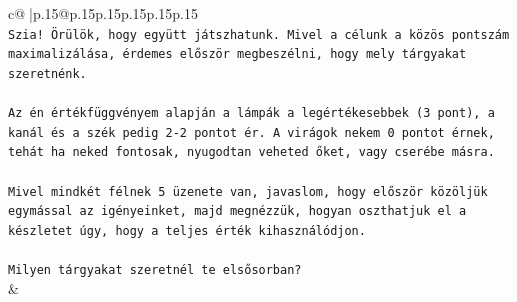 \documentclass{article}
\begin{document}
{\begin{supertabular}{c@{$\;$}|p{.15\linewidth}@{}p{.15\linewidth}p{.15\linewidth}p{.15\linewidth}p{.15\linewidth}p{.15\linewidth}}
{{{\\ 
\texttt{Szia! Örülök, hogy együtt játszhatunk. Mivel a célunk a közös pontszám maximalizálása, érdemes először megbeszélni, hogy mely tárgyakat szeretnénk.} \\
\\ 
\texttt{Az én értékfüggvényem alapján a lámpák a legértékesebbek (3 pont), a kanál és a szék pedig 2{-}2 pontot ér. A virágok nekem 0 pontot érnek, tehát ha neked fontosak, nyugodtan veheted őket, vagy cserébe másra.} \\
\\ 
\texttt{Mivel mindkét félnek 5 üzenete van, javaslom, hogy először közöljük egymással az igényeinket, majd megnézzük, hogyan oszthatjuk el a készletet úgy, hogy a teljes érték kihasználódjon.} \\
\\ 
\texttt{Milyen tárgyakat szeretnél te elsősorban?} \\
            }
        }
    }
    & \\ \\


\end{supertabular}}
\end{document}
